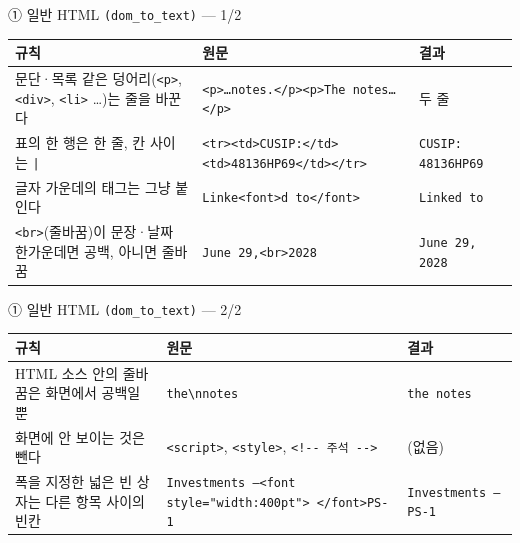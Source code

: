 \begin{frame}{① 일반 HTML \texttt{(dom\_to\_text)} — 1/2}
\small
\begin{tabularx}{\textwidth}{@{}>{\raggedright\arraybackslash}X >{\raggedright\arraybackslash}p{5.0cm} >{\raggedright\arraybackslash}p{3.0cm}@{}}
\toprule
\textbf{규칙} & \textbf{원문} & \textbf{결과} \\
\midrule
문단·목록 같은 덩어리(\texttt{<p>}, \texttt{<div>}, \texttt{<li>} …)는 줄을 바꾼다 & \texttt{<p>…notes.</p><p>The notes…</p>} & 두 줄 \\
표의 한 행은 한 줄, 칸 사이는 \texttt{\textvisiblespace|\textvisiblespace} & \texttt{<tr><td>CUSIP:</td><td>48136HP69</td></tr>} & \texttt{CUSIP: \textbar{} 48136HP69} \\
글자 가운데의 태그는 그냥 붙인다 & \texttt{Linke<font>d to</font>} & \texttt{Linked to} \\
\texttt{<br>}(줄바꿈)이 문장·날짜 한가운데면 공백, 아니면 줄바꿈 & \texttt{June 29,<br>2028} & \texttt{June 29, 2028} \\
\bottomrule
\end{tabularx}
\end{frame}

\begin{frame}{① 일반 HTML \texttt{(dom\_to\_text)} — 2/2}
\small
\begin{tabularx}{\textwidth}{@{}>{\raggedright\arraybackslash}X >{\raggedright\arraybackslash}p{5.0cm} >{\raggedright\arraybackslash}p{3.0cm}@{}}
\toprule
\textbf{규칙} & \textbf{원문} & \textbf{결과} \\
\midrule
HTML 소스 안의 줄바꿈은 화면에서 공백일 뿐 & \texttt{the\textbackslash{}nnotes} & \texttt{the notes} \\
화면에 안 보이는 것은 뺀다 & \texttt{<script>}, \texttt{<style>}, \texttt{<!-{}- 주석 -{}->} & (없음) \\
폭을 지정한 넓은 빈 상자는 다른 항목 사이의 빈칸 & \texttt{Investments —<font style="width:400pt"> </font>PS-1} & \texttt{Investments — \textbar{} PS-1} \\
\bottomrule
\end{tabularx}
\end{frame}

